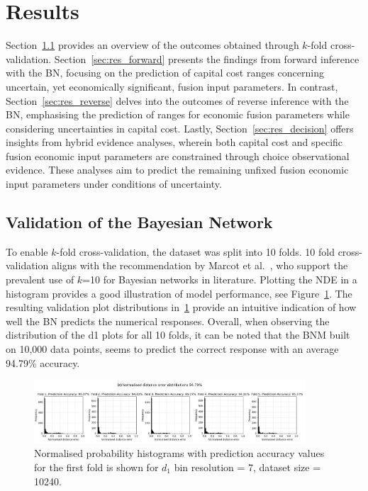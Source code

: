 \documentclass[journal]{IEEEtran}
\begin{document}
\section{Results}\label{sec:Results} 

Section~\ref{sec:res_validation} provides an overview of the outcomes obtained through $k$-fold cross-validation. Section~\ref{sec:res_forward} presents the findings from forward inference with the BN, focusing on the prediction of capital cost ranges concerning uncertain, yet economically significant, fusion input parameters. In contrast, Section~\ref{sec:res_reverse} delves into the outcomes of reverse inference with the BN, emphasising the prediction of ranges for economic fusion parameters while considering uncertainties in capital cost. Lastly, Section~\ref{sec:res_decision} offers insights from hybrid evidence analyses, wherein both capital cost and specific fusion economic input parameters are constrained through choice observational evidence. These analyses aim to predict the remaining unfixed fusion economic input parameters under conditions of uncertainty.

\subsection{Validation of the Bayesian Network}\label{sec:res_validation}
To enable $k$-fold cross-validation, the dataset was split into 10 folds. 10 fold cross-validation aligns with the recommendation by Marcot et al.~\cite{Marcot2021WhatAnalysis}, who support the prevalent use of $k$=10 for Bayesian networks in literature. Plotting the NDE in a histogram provides a good illustration of model performance, see Figure~\ref{fig:k-foldhistograms}. The resulting validation plot distributions in~\ref{fig:k-foldhistograms} provide an intuitive indication of how well the BN predicts the numerical responses. Overall, when observing the distribution of the d1 plots for all 10 folds, it can be noted that the BNM built on 10,000 data points, seems to predict the correct response with an average 94.79\% accuracy.

\begin{figure}
    \centering
    \includegraphics[width=0.9\textwidth]{figures/st20_d1_7bins_folds.png}
    \caption{\small Normalised probability histograms with prediction accuracy values for the first fold is shown for $d_{1}$ bin resolution = 7, dataset size = 10240.}
    \label{fig:k-foldhistograms}
\end{figure}
\end{document}
